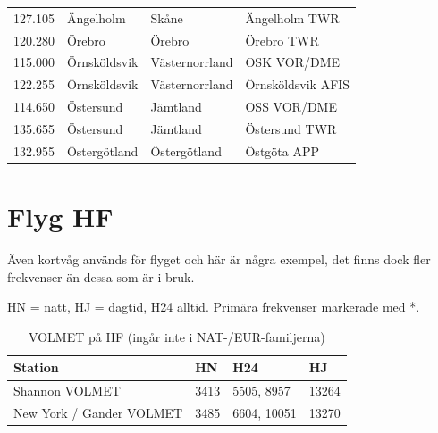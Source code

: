 \begin{longtable}{rlll}
  127.105 & Ängelholm    & Skåne           & Ängelholm TWR                   \\
  120.280 & Örebro       & Örebro          & Örebro TWR                      \\
  115.000 & Örnsköldsvik & Västernorrland  & OSK VOR/DME                     \\
  122.255 & Örnsköldsvik & Västernorrland  & Örnsköldsvik AFIS               \\
  114.650 & Östersund    & Jämtland        & OSS VOR/DME                     \\
  135.655 & Östersund    & Jämtland        & Östersund TWR                   \\
  132.955 & Östergötland & Östergötland    & Östgöta APP                     \\
  \end{longtable}



\section{Flyg HF}

Även kortvåg används för flyget och här är några exempel, det finns
dock fler frekvenser än dessa som är i bruk.

HN = natt, HJ = dagtid, H24 alltid. Primära frekvenser markerade med *.

\begin{table}[H]
\centering
\caption{VOLMET på HF (ingår inte i NAT-/EUR-familjerna)}
\label{tab:hf-volmet}
\small
\begin{tabular}{@{}llll@{}}
\hline
\textbf{Station} & \textbf{HN} & \textbf{H24} & \textbf{HJ} \\
\hline
Shannon VOLMET
  & 3413 & 5505, 8957 & 13264 \\
New York / Gander VOLMET
  & 3485 & 6604, 10051 & 13270 \\
\hline
\end{tabular}
\end{table}


